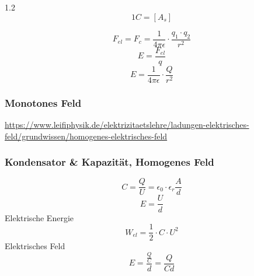\documentclass{article}
\newcommand{\Zeilenabstand}{1.2}
\begin{document}
\begin{spacing}{\Zeilenabstand}
                \begin{equation}
                    1C = [A_{s}]
                \end{equation}

                \begin{equation}
                    F_{el} = F_{c} = \frac{1}{4\pi \epsilon} \cdot \frac{q_{1}\cdot q_{2}}{r^{2}}
                \end{equation}
                \begin{equation}
                    E=\frac{F_{el}}{q}
                \end{equation}
                \begin{equation}
                    E= \frac{1}{4\pi\epsilon}\cdot \frac{Q}{r^{2}}
                \end{equation}

                \subsubsection{Monotones Feld}

                    \url{https://www.leifiphysik.de/elektrizitaetslehre/ladungen-elektrisches-feld/grundwissen/homogenes-elektrisches-feld}

				\subsubsection{Kondensator \& Kapazität, Homogenes Feld}

					\begin{equation}
						C = \frac{Q}{U} = \epsilon_{0}  \cdot \epsilon_{r} \frac{A}{d}
					\end{equation}
					\begin{equation}
						E = \frac{U}{d}
					\end{equation}
					Elektrische Energie
					\begin{equation}
						W_{el} = \frac{1}{2} \cdot C \cdot U^2
					\end{equation}
					Elektrisches Feld
					\begin{equation}
						E = \frac{\frac{Q}{C}}{d} = \frac{Q}{Cd}
					\end{equation}
				
    \end{spacing}
\end{document}

